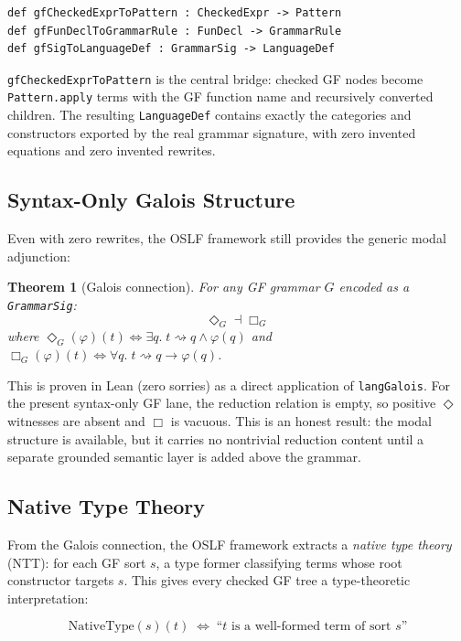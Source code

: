 \documentclass[]{article}
\newtheorem{theorem}{Theorem}
\newcommand{\code}[1]{\texttt{#1}}
\begin{document}
\begin{lstlisting}
def gfCheckedExprToPattern : CheckedExpr -> Pattern
def gfFunDeclToGrammarRule : FunDecl -> GrammarRule
def gfSigToLanguageDef : GrammarSig -> LanguageDef
\end{lstlisting}

\code{gfCheckedExprToPattern} is the central bridge: checked GF nodes
become \code{Pattern.apply} terms with the GF function name and
recursively converted children.  The resulting \code{LanguageDef}
contains exactly the categories and constructors exported by the real
grammar signature, with zero invented equations and zero invented
rewrites.

\subsection{Syntax-Only Galois Structure}

Even with zero rewrites, the OSLF framework still provides the generic
modal adjunction:

\begin{theorem}[Galois connection]
For any GF grammar $G$ encoded as a \code{GrammarSig}:
$$\Diamond_G \dashv \Box_G$$
where $\Diamond_G(\varphi)(t) \Leftrightarrow \exists q.\; t \rightsquigarrow q \land \varphi(q)$
and $\Box_G(\varphi)(t) \Leftrightarrow \forall q.\; t \rightsquigarrow q \to \varphi(q)$.
\end{theorem}

This is proven in Lean (zero sorries) as a direct application of
\code{langGalois}.  For the present syntax-only GF lane, the reduction
relation is empty, so positive $\Diamond$ witnesses are absent and
$\Box$ is vacuous.  This is an honest result: the modal structure is
available, but it carries no nontrivial reduction content until a
separate grounded semantic layer is added above the grammar.

\subsection{Native Type Theory}

From the Galois connection, the OSLF framework extracts a
\emph{native type theory} (NTT): for each GF sort $s$, a type former
classifying terms whose root constructor targets $s$.  This gives
every checked GF tree a type-theoretic interpretation:

$$\text{NativeType}(s)(t) \;\Leftrightarrow\; \text{``}t\text{ is a well-formed term of sort }s\text{''}$$
\end{document}
